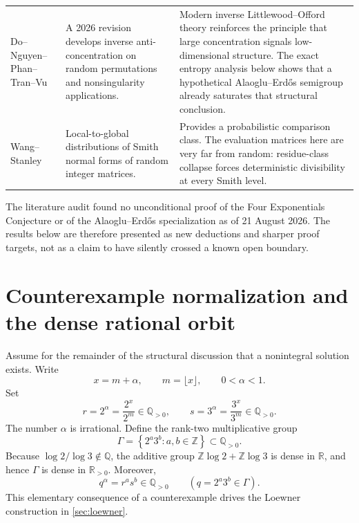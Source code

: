 \documentclass[11pt,oneside]{article}
\theoremstyle{definition}
\theoremstyle{remark}
\newcommand{\AEconj}{Alaoglu--Erd\H{o}s}
\newcommand{\R}{\mathbb{R}}
\newcommand{\Q}{\mathbb{Q}}
\newcommand{\Z}{\mathbb{Z}}
\newcommand{\set}[1]{\left\{#1\right\}}
\begin{document}
\begin{longtable}{@{}>{\raggedright\arraybackslash}p{}>{\raggedright\arraybackslash}p{}>{\raggedright\arraybackslash}p{}@{}}
Do--Nguyen--Phan--Tran--Vu \cite{DoEtAl2026} & A 2026 revision develops inverse anti-concentration on random permutations and nonsingularity applications. & Modern inverse Littlewood--Offord theory reinforces the principle that large concentration signals low-dimensional structure.  The exact entropy analysis below shows that a hypothetical \AEconj{} semigroup already saturates that structural conclusion.\\
Wang--Stanley \cite{WangStanley2017} & Local-to-global distributions of Smith normal forms of random integer matrices. & Provides a probabilistic comparison class.  The evaluation matrices here are very far from random: residue-class collapse forces deterministic divisibility at every Smith level.\\
\bottomrule
\end{longtable}

\begin{auditbox}
The literature audit found no unconditional proof of the Four Exponentials Conjecture or of the \AEconj{} specialization as of 21 August 2026.  The results below are therefore presented as new deductions and sharper proof targets, not as a claim to have silently crossed a known open boundary.
\end{auditbox}

\section{Counterexample normalization and the dense rational orbit}
\label{sec:normalization}

Assume for the remainder of the structural discussion that a nonintegral solution exists.  Write
\[
 x=m+\alpha,
 \qquad m=\lfloor x\rfloor,\qquad 0<\alpha<1.
\]
Set
\begin{equation}
 r=2^\alpha=\frac{2^x}{2^m}\in\Q_{>0},
 \qquad
 s=3^\alpha=\frac{3^x}{3^m}\in\Q_{>0}.
 \label{eq:r-s}
\end{equation}
The number $\alpha$ is irrational.  Define the rank-two multiplicative group
\begin{equation}
 \Gamma=\set{2^a3^b:a,b\in\Z}\subset\Q_{>0}.
 \label{eq:Gamma}
\end{equation}
Because $\log2/\log3\notin\Q$, the additive group $\Z\log2+\Z\log3$ is dense in $\R$, and hence $\Gamma$ is dense in $\R_{>0}$.  Moreover,
\begin{equation}
 q^\alpha=r^a s^b\in\Q_{>0}
 \qquad(q=2^a3^b\in\Gamma).
 \label{eq:dense-rational}
\end{equation}
This elementary consequence of a counterexample drives the Loewner construction in \cref{sec:loewner}.
\end{document}

